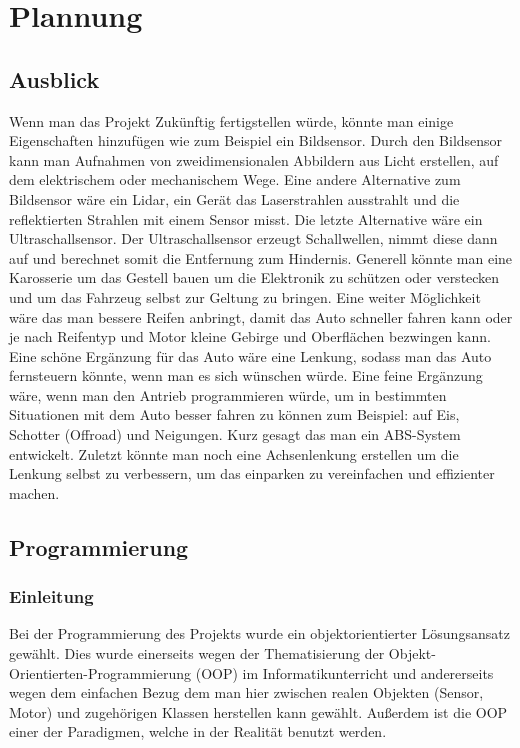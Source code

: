 \documentclass[notitlepage]{report}
\begin{document}
\chapter{Plannung}

\section{Ausblick}

Wenn man das Projekt Zuk\"{u}nftig fertigstellen w\"{u}rde, k\"{o}nnte man einige Eigenschaften hinzuf\"{u}gen wie zum Beispiel ein Bildsensor. Durch den Bildsensor kann man Aufnahmen von zweidimensionalen Abbildern aus Licht erstellen, auf dem elektrischem oder mechanischem Wege. Eine andere Alternative zum Bildsensor w\"{a}re ein Lidar, ein Ger\"{a}t das Laserstrahlen ausstrahlt und die reflektierten Strahlen mit einem Sensor misst. Die letzte Alternative w\"{a}re ein Ultraschallsensor. Der Ultraschallsensor erzeugt Schallwellen, nimmt diese dann auf und berechnet somit die Entfernung zum Hindernis. Generell k\"{o}nnte man eine Karosserie um das Gestell bauen um die Elektronik zu sch\"{u}tzen oder verstecken und um das Fahrzeug selbst zur Geltung zu bringen. Eine weiter M\"{o}glichkeit w\"{a}re das man bessere Reifen anbringt, damit das Auto schneller fahren kann oder je nach Reifentyp und Motor kleine Gebirge und Oberfl\"{a}chen bezwingen kann. Eine sch\"{o}ne Erg\"{a}nzung f\"{u}r das Auto w\"{a}re eine Lenkung, sodass man das Auto fernsteuern k\"{o}nnte, wenn man es sich w\"{u}nschen w\"{u}rde. Eine feine Erg\"{a}nzung w\"{a}re, wenn man den Antrieb programmieren w\"{u}rde, um in bestimmten Situationen mit dem Auto besser fahren zu k\"{o}nnen zum Beispiel: auf Eis, Schotter (Offroad) und Neigungen. Kurz gesagt das man ein ABS-System entwickelt. Zuletzt k\"{o}nnte man noch eine Achsenlenkung erstellen um die Lenkung selbst zu verbessern, um das einparken zu vereinfachen und effizienter machen.

\section{Programmierung}

\subsection{Einleitung}
Bei der Programmierung des Projekts wurde ein objektorientierter L\"{o}sungsansatz gew\"{a}hlt. Dies wurde einerseits wegen der Thematisierung der Objekt-Orientierten-Programmierung (OOP) im Informatikunterricht und andererseits wegen dem einfachen Bezug dem man hier zwischen realen Objekten (Sensor, Motor) und zugeh\"{o}rigen Klassen herstellen kann gew\"{a}hlt. Au{\ss}erdem ist die OOP einer der Paradigmen, welche in der Realit\"{a}t benutzt werden. 
\end{document}
